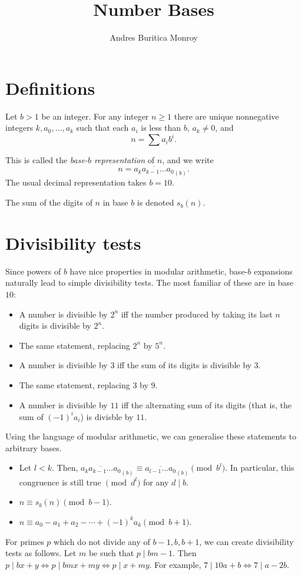 \documentclass{article}
\title{Number Bases}
\author{Andres Buritica Monroy}
\date{}
\begin{document}
\maketitle
\section{Definitions}
Let $b>1$ be an integer. For any integer $n\ge 1$ there are unique nonnegative
integers $k,a_0,\ldots,a_k$ such that each $a_i$ is less than $b$,
$a_k\ne 0$, and \[n=\sum a_i b^i.\]

This is called the \emph{base-$b$ representation} of $n$, and we write
\[n=\overline{a_k a_{k-1}\ldots a_0}_{(b)}.\]
The usual decimal representation takes $b=10$.

The sum of the digits of $n$ in base $b$ is denoted $s_b(n)$.
\section{Divisibility tests}
Since powers of $b$ have nice properties in modular arithmetic, base-$b$ expansions
naturally lead to simple divisibility tests. The most familiar of these are in
base $10$:
\begin{itemize}
	\item A number is divisible by $2^n$ iff the number produced by taking its
	      last $n$ digits is divisible by $2^n$.
	\item The same statement, replacing $2^n$ by $5^n$.
	\item A number is divisible by $3$ iff the sum of its digits is divisible by
	      $3$.
	\item The same statement, replacing $3$ by $9$.
	\item A number is divisible by $11$ iff the alternating sum of its digits
	      (that is, the sum of $(-1)^i a_i$) is divisble by $11$.
\end{itemize}
Using the language of modular arithmetic, we can generalise these statements to
arbitrary bases.
\begin{itemize}
	\item Let $l<k$. Then,
	      $\overline{a_k a_{k-1}\ldots a_0}_{(b)}\equiv \overline{a_{l-1}\ldots
			      a_0}_{(b)}\pmod{b^l}$. In particular, this congruence is still true
	      $\pmod{d^l}$ for any $d\mid b$.
	\item $n\equiv s_b(n)\pmod{b-1}$.
	\item $n\equiv a_0-a_1+a_2-\cdots+(-1)^k a_k\pmod {b+1}$.
\end{itemize}
For primes $p$ which do not divide any of $b-1,b,b+1$,
we can create divisibility tests as follows. Let $m$ be
such that $p\mid bm-1$. Then $p\mid bx+y\iff p\mid bmx+my\iff p\mid
	x+my$. For example, $7\mid 10a+b\iff 7\mid a-2b$.
\end{document}
